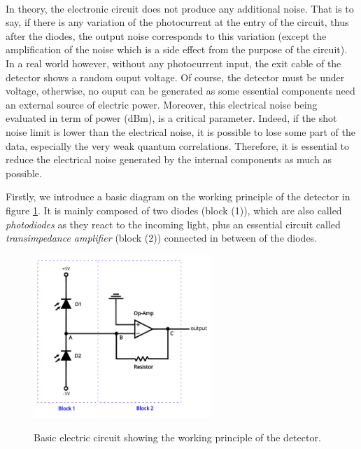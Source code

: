\documentclass[12pt]{report}
\begin{document}
\paragraph{}

In theory, the electronic circuit does not produce any additional noise. That is to say, if there is any variation of the photocurrent at the entry of the circuit, thus after the diodes, the output noise corresponds to this variation (except the amplification of the noise which is a side effect from the purpose of the circuit). In a real world however, without any photocurrent input, the exit cable of the detector shows a random ouput voltage. Of course, the detector must be under voltage, otherwise, no ouput can be generated as some essential components need an external source of electric power. Moreover, this electrical noise being evaluated in term of power (dBm), is a critical parameter. Indeed, if the shot noise limit is lower than the electrical noise, it is possible to lose some part of the data, especially the very weak quantum correlations. Therefore, it is essential to reduce the electrical noise generated by the internal components as much as possible.

Firstly, we introduce a basic diagram on the working principle of the detector in figure \ref{fig:detector-fst}. It is mainly composed of two diodes (block (1)), which are also called \textit{photodiodes} as they react to the incoming light, plus an essential circuit called \textit{transimpedance amplifier} (block (2)) connected in between of the diodes.

\begin{figure}[h!]
\caption{Basic electric circuit showing the working principle of the detector.}
\centering
\includegraphics[width=0.6\textwidth]{detector-fst}
\label{fig:detector-fst}
\end{figure}
\end{document}
